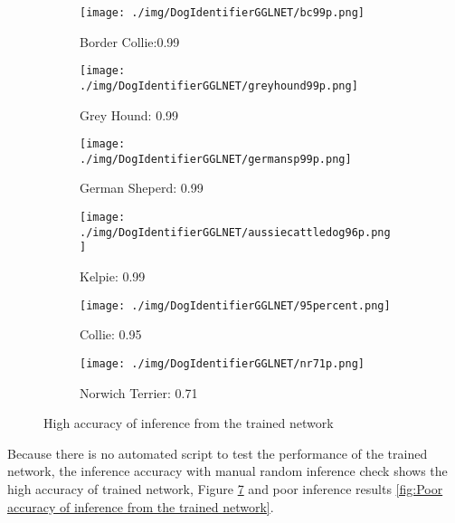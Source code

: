 \documentclass[10pt,journal,compsoc]{IEEEtran}
\begin{document}
\begin{figure}[thpb]
      \begin{subfigure}[b]{0.23\textwidth}
              \texttt{[image: ./img/DogIdentifierGGLNET/bc99p.png]}
              \caption{Border Collie:0.99}
              \label{fig:Infer_bc99}
      \end{subfigure}%
      \begin{subfigure}[b]{0.23\textwidth}
            \texttt{[image: ./img/DogIdentifierGGLNET/greyhound99p.png]}
            \caption{Grey Hound: 0.99}
            \label{fig:Infer_grh99}
      \end{subfigure}
      \begin{subfigure}[b]{0.23\textwidth}
            \texttt{[image: ./img/DogIdentifierGGLNET/germansp99p.png]}
            \caption{German Sheperd: 0.99}
            \label{fig:Infer_gs99}
      \end{subfigure}%
      \begin{subfigure}[b]{0.23\textwidth}
            \texttt{[image: ./img/DogIdentifierGGLNET/aussiecattledog96p.png]}
            \caption{Kelpie: 0.99}
            \label{fig:Infer_ke99}
      \end{subfigure}
      \begin{subfigure}[b]{0.23\textwidth}
            \texttt{[image: ./img/DogIdentifierGGLNET/95percent.png]}
            \caption{Collie: 0.95}
            \label{fig:Infer_co96}
      \end{subfigure}%
      \begin{subfigure}[b]{0.23\textwidth}
            \texttt{[image: ./img/DogIdentifierGGLNET/nr71p.png]}
            \caption{Norwich Terrier: 0.71}
            \label{fig:nl71}
      \end{subfigure}
      \caption{High accuracy of inference from the trained network}\label{fig:High accuracy of results from trained network}
\end{figure}
Because there is no automated script to test the performance of the trained network, the inference accuracy with manual random inference check shows the high accuracy of trained network, Figure \ref{fig:High accuracy of results from trained network} and poor inference results \ref{fig:Poor accuracy of inference from the trained network}.
\end{document}
